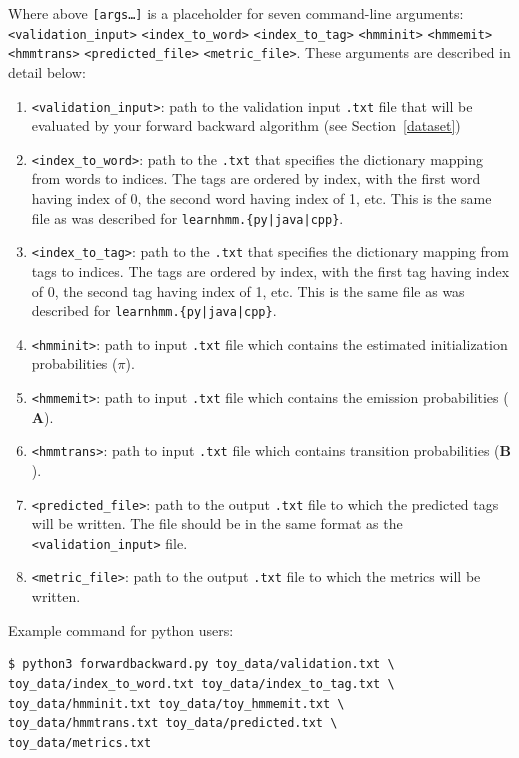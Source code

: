\documentclass[11pt,addpoints,answers]{exam}
\begin{document}
Where above \texttt{[args\dots]} is a placeholder for seven command-line arguments:\texttt{<validation\_input>} \texttt{<index\_to\_word>} \texttt{<index\_to\_tag>} \texttt{<hmminit>} \texttt{<hmmemit>} \texttt{<hmmtrans>} \texttt{<predicted\_file>} \texttt{<metric\_file>}. These arguments are described in detail below:
\begin{enumerate}
    \item \texttt{<validation\_input>}: path to the validation input \texttt{.txt} file that will be evaluated by your forward backward algorithm (see Section~\ref{dataset})
    \item \texttt{<index\_to\_word>}: path to the \texttt{.txt} that specifies the dictionary mapping from words to indices. The tags are ordered by index, with the first word having index of 0, the second word having index of 1, etc. This is the same file as was described for \texttt{learnhmm.\{py|java|cpp\}}.
    \item \texttt{<index\_to\_tag>}: path to the \texttt{.txt} that specifies the dictionary mapping from tags to indices. The tags are ordered by index, with the first tag having index of 0, the second tag having index of 1, etc. This is the same file as was described for \texttt{learnhmm.\{py|java|cpp\}}.
    \item \texttt{<hmminit>}: path to input \texttt{.txt} file which contains the estimated initialization probabilities (\boldmath${\pi}$).
    \item \texttt{<hmmemit>}: path to input \texttt{.txt} file which contains the emission probabilities ($\mathbf A$).
    \item \texttt{<hmmtrans>}: path to input \texttt{.txt} file which contains transition probabilities ($\mathbf B$).
    \item \texttt{<predicted\_file>}: path to the output \texttt{.txt} file to which the predicted tags will be written. The file should be in the same format as the \texttt{<validation\_input>} file. 
    \item \texttt{<metric\_file>}: path to the output \texttt{.txt} file to which the metrics will be written. 
\end{enumerate}

\clearpage

Example command for python users:
\begin{lstlisting}
$ python3 forwardbackward.py toy_data/validation.txt \ 
toy_data/index_to_word.txt toy_data/index_to_tag.txt \
toy_data/hmminit.txt toy_data/toy_hmmemit.txt \
toy_data/hmmtrans.txt toy_data/predicted.txt \ 
toy_data/metrics.txt
\end{lstlisting}
\end{document}
